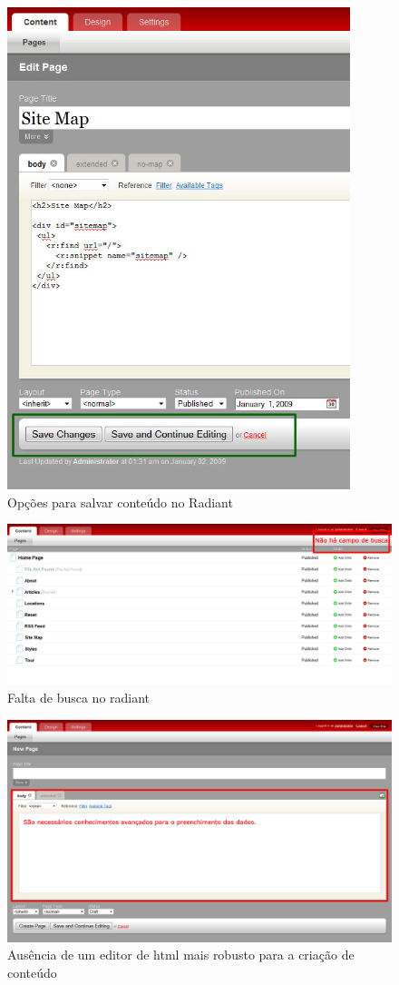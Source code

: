 \begin{figure}[here]
\includegraphics[width=100mm]{images/radiant_ponto_opcoes.jpg}
\caption{Opções para salvar conteúdo no Radiant }
\label{fig:salvar_radiant}
\end{figure}

\begin{figure}[here]
\includegraphics[width=150mm]{images/radiant_erro_busca.jpg}
\caption{Falta de busca no radiant}
\label{fig:falta_busca_radiant}
\end{figure}

\begin{figure}[here]
\includegraphics[width=150mm]{images/radiant_erro_conhecimento.jpg}
\caption{Ausência de um editor de html mais robusto para a criação de conteúdo}
\label{fig:falta_editor_radiant}
\end{figure}


